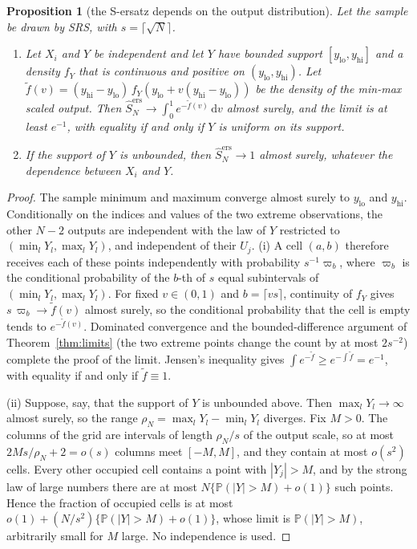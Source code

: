 \documentclass[11pt,a4paper]{article}
\newtheorem{proposition}[theorem]{Proposition}
\theoremstyle{definition}
\theoremstyle{remark}
\newcommand{\Prob}{\mathbb{P}}
\newcommand{\Sers}{\hat S^{\mathrm{ers}}_N}
\begin{document}
\begin{proposition}[the S-ersatz depends on the output distribution]\label{prop:ersatz}
Let the sample be drawn by SRS, with $s=\lceil\sqrt N\rceil$.
\begin{enumerate}[label=(\roman*)]
\item Let $X_i$ and $Y$ be independent and let $Y$ have bounded support $[y_{\mathrm{lo}},y_{\mathrm{hi}}]$ and a density $f_Y$ that is continuous and positive on $(y_{\mathrm{lo}},y_{\mathrm{hi}})$. Let $\tilde f(v)=(y_{\mathrm{hi}}-y_{\mathrm{lo}})\,f_Y(y_{\mathrm{lo}}+v(y_{\mathrm{hi}}-y_{\mathrm{lo}}))$ be the density of the min-max scaled output. Then $\Sers\to\int_0^1e^{-\tilde f(v)}\,\mathrm dv$ almost surely, and the limit is at least $e^{-1}$, with equality if and only if $Y$ is uniform on its support.
\item If the support of $Y$ is unbounded, then $\Sers\to1$ almost surely, whatever the dependence between $X_i$ and $Y$.
\end{enumerate}
\end{proposition}

\begin{proof}
The sample minimum and maximum converge almost surely to $y_{\mathrm{lo}}$ and $y_{\mathrm{hi}}$. Conditionally on the indices and values of the two extreme observations, the other $N-2$ outputs are independent with the law of $Y$ restricted to $(\min_lY_l,\max_lY_l)$, and independent of their $U_j$. (i) A cell $(a,b)$ therefore receives each of these points independently with probability $s^{-1}\varpi_b$, where $\varpi_b$ is the conditional probability of the $b$-th of $s$ equal subintervals of $(\min_lY_l,\max_lY_l)$. For fixed $v\in(0,1)$ and $b=\lceil vs\rceil$, continuity of $f_Y$ gives $s\,\varpi_b\to\tilde f(v)$ almost surely, so the conditional probability that the cell is empty tends to $e^{-\tilde f(v)}$. Dominated convergence and the bounded-difference argument of Theorem~\ref{thm:limits} (the two extreme points change the count by at most $2s^{-2}$) complete the proof of the limit. Jensen's inequality gives $\int e^{-\tilde f}\ge e^{-\int\tilde f}=e^{-1}$, with equality if and only if $\tilde f\equiv1$.

(ii) Suppose, say, that the support of $Y$ is unbounded above. Then $\max_lY_l\to\infty$ almost surely, so the range $\rho_N=\max_lY_l-\min_lY_l$ diverges. Fix $M>0$. The columns of the grid are intervals of length $\rho_N/s$ of the output scale, so at most $2Ms/\rho_N+2=o(s)$ columns meet $[-M,M]$, and they contain at most $o(s^2)$ cells. Every other occupied cell contains a point with $|Y_j|>M$, and by the strong law of large numbers there are at most $N\{\Prob(|Y|>M)+o(1)\}$ such points. Hence the fraction of occupied cells is at most $o(1)+(N/s^2)\{\Prob(|Y|>M)+o(1)\}$, whose limit is $\Prob(|Y|>M)$, arbitrarily small for $M$ large. No independence is used.
\end{proof}
\end{document}
